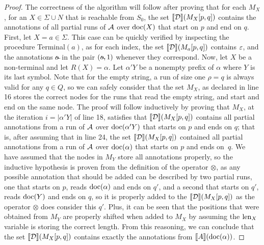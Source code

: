 \begin{proof}
	
	The correctness of the algorithm will follow after proving that for each $M_X$, for an $X\in\Sigma\cup N$ that is reachable from $S_0$, the set ${\llbracket{\mathcal{D}}\rrbracket}(M_X[p,q])$ contains the annotations of all partial runs of $\mathcal{A}$ over $\operatorname{doc}(X)$ that start on $p$ and end on $q$. First, let $X = a\in\Sigma$. This case can be quickly verified by inspecting the procedure {\sc Terminal}$(a)$, as for each index, the set ${\llbracket{\mathcal{D}}\rrbracket}(M_a[p,q])$ contains $\varepsilon$, and the annotations $\oout$ in the pair $(\oout, 1)$ whenever they correspond. Now, let $X$ be a non-terminal and let $R(X) = \alpha$. Let $\alpha' Y$ be a nonempty prefix of $\alpha$ where $Y$ is its last symbol. Note that for the empty string, a run of size one $\rho = q$ is always valid for any $q\in Q$, so we can safely consider that the set $M_X$, as declared in line 16 stores the correct nodes for the runs that read the empty string, and start and end on the same node. The proof will follow inductively by proving that $M_X$, at the iteration $i = |\alpha'Y|$ of line 18, satisfies that ${\llbracket{\mathcal{D}}\rrbracket}(M_X[p,q])$ contains all partial annotations from a run of $\mathcal{A}$ over $\operatorname{doc}(\alpha' Y)$ that starts on $p$ and ends on $q$; that is, after assuming that in line 24, the set ${\llbracket{\mathcal{D}}\rrbracket}(M_X[p,q])$ contained all partial annotations from a run of $\mathcal{A}$ over $\operatorname{doc}(\alpha)$ that starts on $p$ and ends on~$q$. We have assumed that the nodes in $M_Y$ store all annotations properly, so the inductive hypothesis is proven from the definition of the operator $\otimes$, as any possible annotation that should be added can be described by two partial runs, one that starts on $p$, reads $\operatorname{doc}(\alpha)$ and ends on $q'$, and a second that starts on $q'$, reads $\operatorname{doc}(Y)$ and ends on $q$, so it is properly added to the ${\llbracket{\mathcal{D}}\rrbracket}(M_X[p,q])$ as the operator $\otimes$ does consider this $q'$. Plus, it can be seen that the positions that were obtained from $M_Y$ are properly shifted when added to $M_X$ by assuming the $\operatorname{len}_X$ variable is storing the correct length. From this reasoning, we can conclude that the set ${\llbracket{\mathcal{D}}\rrbracket}(M_X[p,q])$ contains exactly the annotations from ${\llbracket{A}\rrbracket}(\operatorname{doc}(\alpha))$.
	

\end{proof}
